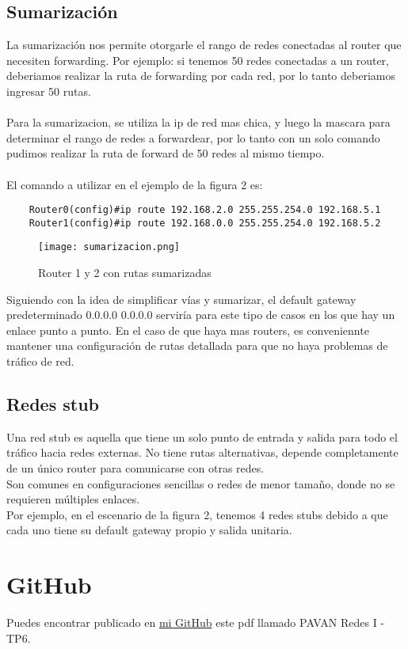 \documentclass{article}
\begin{document}
\subsection{Sumarización}
La sumarización nos permite otorgarle el rango de redes conectadas al router que necesiten forwarding. Por ejemplo: si tenemos 50 redes conectadas a un router, deberiamos realizar la ruta de forwarding por cada red, por lo tanto deberiamos ingresar 50 rutas.
\\\\
Para la sumarizacion, se utiliza la ip de red mas chica,  y luego la mascara para determinar el rango de redes a forwardear, por lo tanto con un solo comando pudimos realizar la ruta de forward de 50 redes al mismo tiempo.
\\\\
El comando a utilizar en el ejemplo de la figura 2 es:
\begin{lstlisting}
    Router0(config)#ip route 192.168.2.0 255.255.254.0 192.168.5.1
    Router1(config)#ip route 192.168.0.0 255.255.254.0 192.168.5.2
\end{lstlisting}
\begin{figure}[H]
    \centering
    \texttt{[image: sumarizacion.png]}
    \caption{Router 1 y 2 con rutas sumarizadas}
    \label{fig:enter-label}
\end{figure}
Siguiendo con la idea de simplificar vías y sumarizar, el default gateway predeterminado 0.0.0.0 0.0.0.0 serviría para este tipo de casos en los que hay un enlace punto a punto. En el caso de que haya mas routers, es conveniennte mantener una configuración de rutas detallada para que no haya problemas de tráfico de red.

\subsection{Redes stub}
Una red stub es aquella que tiene un solo punto de entrada y salida para todo el tráfico hacia redes externas. No tiene rutas alternativas, depende completamente de un único router para comunicarse con otras redes.
\\
Son comunes en configuraciones sencillas o redes de menor tamaño, donde no se requieren múltiples enlaces.
\\
Por ejemplo, en el escenario de la figura 2, tenemos 4 redes stubs debido a que cada uno tiene su default gateway propio y salida unitaria.

\section{GitHub}
Puedes encontrar publicado en \href{https://github.com/martinpavan1/redes1}{mi GitHub} este pdf llamado PAVAN Redes I - TP6.
\end{document}
